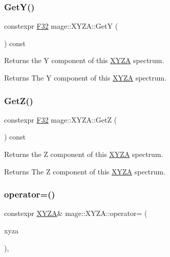 \subsubsection{\texorpdfstring{Get\+Y()}{GetY()}}
{\footnotesize\ttfamily constexpr \mbox{\hyperlink{namespacemage_aa97e833b45f06d60a0a9c4fc22ae02c0}{F32}} mage\+::\+X\+Y\+Z\+A\+::\+GetY (\begin{DoxyParamCaption}{ }\end{DoxyParamCaption}) const\hspace{0.3cm}{\ttfamily [noexcept]}}

Returns the Y component of this \mbox{\hyperlink{structmage_1_1_x_y_z_a}{X\+Y\+ZA}} spectrum.

\begin{DoxyReturn}{Returns}
The Y component of this \mbox{\hyperlink{structmage_1_1_x_y_z_a}{X\+Y\+ZA}} spectrum. 
\end{DoxyReturn}
\mbox{\label{structmage_1_1_x_y_z_a_a951b69d9024672c0d59f81e15c9f7f6b}} 
\subsubsection{\texorpdfstring{Get\+Z()}{GetZ()}}
{\footnotesize\ttfamily constexpr \mbox{\hyperlink{namespacemage_aa97e833b45f06d60a0a9c4fc22ae02c0}{F32}} mage\+::\+X\+Y\+Z\+A\+::\+GetZ (\begin{DoxyParamCaption}{ }\end{DoxyParamCaption}) const\hspace{0.3cm}{\ttfamily [noexcept]}}

Returns the Z component of this \mbox{\hyperlink{structmage_1_1_x_y_z_a}{X\+Y\+ZA}} spectrum.

\begin{DoxyReturn}{Returns}
The Z component of this \mbox{\hyperlink{structmage_1_1_x_y_z_a}{X\+Y\+ZA}} spectrum. 
\end{DoxyReturn}
\mbox{\label{structmage_1_1_x_y_z_a_a04a66bdc8e61c6b415e1b509f466bf50}} 
\subsubsection{\texorpdfstring{operator=()}{operator=()}\hspace{0.1cm}{\footnotesize\ttfamily [1/2]}}
{\footnotesize\ttfamily constexpr \mbox{\hyperlink{structmage_1_1_x_y_z_a}{X\+Y\+ZA}}\& mage\+::\+X\+Y\+Z\+A\+::operator= (\begin{DoxyParamCaption}\item[{const \mbox{\hyperlink{structmage_1_1_x_y_z_a}{X\+Y\+ZA}} \&}]{xyza }\end{DoxyParamCaption})\hspace{0.3cm}{\ttfamily [default]}, {\ttfamily [noexcept]}}

